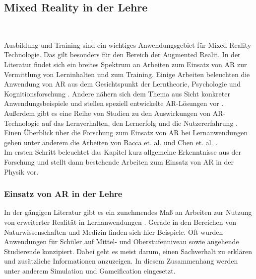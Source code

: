 \subsection{Mixed Reality in der Lehre}
\label{sec-2-2}
\begin{center}
	\\	
\end{center}

Ausbildung und Training sind ein wichtiges Anwendungsgebiet für Mixed Reality Technologie. Das gilt besonders für den Bereich der Augmented Realit. In der Literatur findet sich ein breites Spektrum an Arbeiten zum Einsatz von AR zur Vermittlung von Lerninhalten und zum Training. Einige Arbeiten beleuchten die Anwendung von AR aus dem Gesichtspunkt der Lerntheorie, Psychologie und Kognitionsforschung \cite{Marichal17, Santos14}. Andere nähern sich dem Thema aus Sicht konkreter Anwendungsbeispiele und stellen speziell entwickelte AR-Lösungen vor \cite{Strzys17, Amiraslanov18, Buchau09}. Außerdem gibt es eine Reihe von Studien zu den Auswirkungen von AR-Technologie auf das Lernverhalten, den Lernerfolg und die Nutzererfahrung \cite{Ibanez14, Li11, Jerry10, Akcayir16, Strzys18}. Einen Überblick über die Forschung zum Einsatz von AR bei Lernanwendungen geben unter anderem die Arbeiten von Bacca et. al. und Chen et. al. \cite{Chen2017, Bacca14}.\\

Im ersten Schritt beleuchtet das Kapitel kurz allgemeine Erkenntnisse aus der Forschung und stellt dann bestehende Arbeiten zum Einsatz von AR in der Physik vor.

\subsubsection{Einsatz von AR in der Lehre}
In der gängigen Literatur gibt es ein zunehmendes Maß an Arbeiten zur Nutzung von erweiterter Realität in Lernanwendungen \cite{Bacca14, Ibanez18}. Gerade in den Bereichen von Naturwissenschaften und Medizin finden sich hier Beispiele. Oft wurden Anwendungen für Schüler auf Mittel- und Oberstufenniveau sowie angehende Studierende konzipiert. Dabei geht es meist darum, einen Sachverhalt zu erklären und zusätzliche Informationen anzuzeigen. In diesem Zusammenhang werden unter anderem Simulation und Gameification eingesetzt.\\

